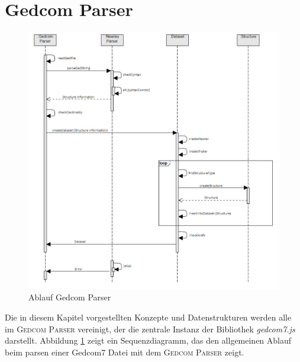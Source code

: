 \section{Gedcom Parser}
\begin{figure}[b]
	\centering
	\includegraphics[width=1\textwidth]{images/konzept_sequenz.png}
	\caption{Ablauf Gedcom Parser}
	\label{fig: Sequenz Gedcom Parser}
\end{figure}
\label{sec: Konzept - Gedcom Parser}
Die in diesem Kapitel vorgestellten Konzepte und Datenstrukturen werden alle im \textsc{Gedcom Parser} vereinigt, der die zentrale Instanz der Bibliothek \textit{gedcom7.js} darstellt. Abbildung \ref{fig: Sequenz Gedcom Parser} zeigt ein Sequenzdiagramm, das den allgemeinen Ablauf beim parsen einer Gedcom7 Datei mit dem \textsc{Gedcom Parser} zeigt. 

